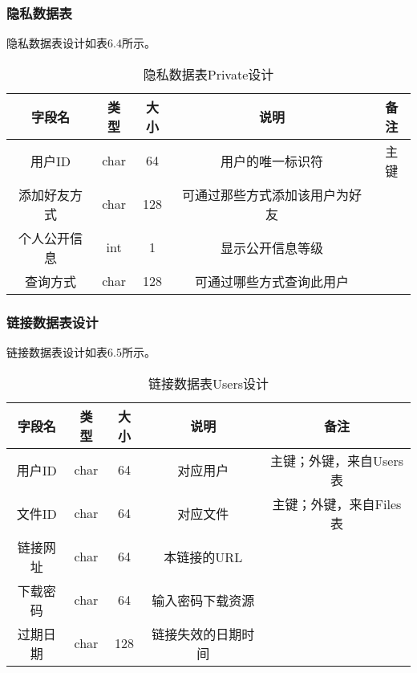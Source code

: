 {\subsubsection{隐私数据表}
隐私数据表设计如表6.4所示。
\begin{table}[htbp]
\centering
\caption{隐私数据表Private设计} \label{tab:friend-database}
\begin{tabular}{|c|c|c|c|c|}
    \hline
    字段名 & 类型 & 大小 & 说明 & 备注 \\
    \hline
    用户ID & char & 64 & 用户的唯一标识符 & 主键\\
    \hline
    添加好友方式 & char & 128 & 可通过那些方式添加该用户为好友 & \\
    \hline
    个人公开信息 & int & 1 & 显示公开信息等级 & \\
    \hline
    查询方式 & char & 128 & 可通过哪些方式查询此用户 & \\
    \hline
\end{tabular}
\end{table}

}


\subsubsection{链接数据表设计}
链接数据表设计如表6.5所示。
\begin{table}[htbp]
\centering
\caption{链接数据表Users设计} \label{tab:link-database}
\begin{tabular}{|c|c|c|c|c|}
    \hline
    字段名 & 类型 & 大小 & 说明 & 备注 \\
    \hline
    用户ID & char & 64 & 对应用户 & 主键；外键，来自Users表\\
    \hline
    文件ID & char & 64 & 对应文件 & 主键；外键，来自Files表\\
    \hline
    链接网址 & char & 64 & 本链接的URL & \\
    \hline
    下载密码 & char & 64 & 输入密码下载资源 & \\
    \hline
    过期日期 & char & 128 & 链接失效的日期时间 & \\
    \hline 
\end{tabular}
\end{table}


